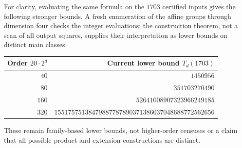 For clarity, evaluating the same formula on the $1703$ certified inputs
gives the following stronger bounds. A fresh enumeration of the affine
groups through dimension four checks the integer evaluations; the
construction theorem, not a scan of all output squares, supplies their
interpretation as lower bounds on distinct main classes.
\begin{center}
\small
\begin{tabular}{r r}
\toprule
Order $20\cdot 2^d$ & Current lower bound $T_d(1703)$\\
\midrule
$40$ & $1450956$\\
$80$ & $351703270490$\\
$160$ & $52641008907323966249185$\\
$320$ & $15517575138479887787890371386037048688772562656$\\
\bottomrule
\end{tabular}
\end{center}
These remain family-based lower bounds, not higher-order censuses or a
claim that all possible product and extension constructions are distinct.
